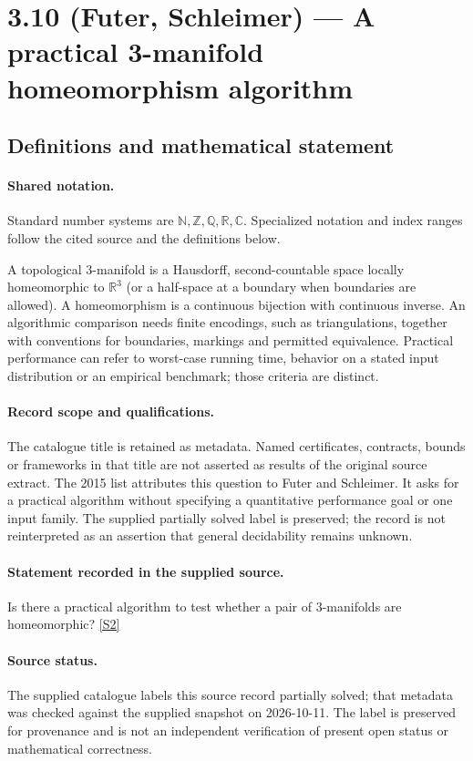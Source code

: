 \documentclass[11pt]{article}
\newcommand{\sref}[2]{\hyperlink{source:#1:#2}{[S#2]}}
\begin{document}
\section{3.10 (Futer, Schleimer) — A practical 3-manifold homeomorphism algorithm}\label{statement}

\subsection{Definitions and mathematical statement}

\paragraph{Shared notation.}Standard number systems are $\mathbb N,\mathbb Z,\mathbb Q,\mathbb R,\mathbb C$. Specialized notation and index ranges follow the cited source and the definitions below.


A topological $3$-manifold is a Hausdorff, second-countable space locally homeomorphic to $\mathbb R^3$ (or a half-space at a boundary when boundaries are allowed). A homeomorphism is a continuous bijection with continuous inverse. An algorithmic comparison needs finite encodings, such as triangulations, together with conventions for boundaries, markings and permitted equivalence. Practical performance can refer to worst-case running time, behavior on a stated input distribution or an empirical benchmark; those criteria are distinct.
\paragraph{Record scope and qualifications.}
The catalogue title is retained as metadata. Named certificates, contracts, bounds or frameworks in that title are not asserted as results of the original source extract.
The 2015 list attributes this question to Futer and Schleimer. It asks for a practical algorithm without specifying a quantitative performance goal or one input family. The supplied partially solved label is preserved; the record is not reinterpreted as an assertion that general decidability remains unknown.
\paragraph{Statement recorded in the supplied source.}
Is there a practical algorithm to test whether a pair of $3$-manifolds are homeomorphic? \sref{statement}{2}
\paragraph{Source status.}
The supplied catalogue labels this source record partially solved; that metadata was checked against the supplied snapshot on 2026-10-11. The label is preserved for provenance and is not an independent verification of present open status or mathematical correctness.
\end{document}
